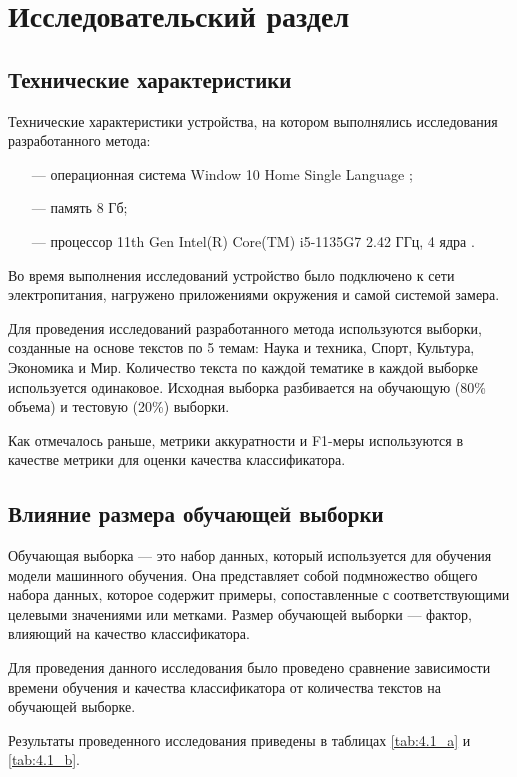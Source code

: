 \chapter{Исследовательский раздел}
\section{Технические характеристики}
Технические характеристики устройства, на котором выполнялись исследования разработанного метода:

\begin{itemize}
	\item[---] операционная система Window 10 Home Single Language \cite{window};
	\item[---] память 8 Гб;
	\item[---] процессор 11th Gen Intel(R) Core(TM) i5-1135G7 2.42 ГГц, 4 ядра \cite{cpu}.
\end{itemize}

Во время выполнения исследований устройство было подключено к сети электропитания, нагружено приложениями окружения и самой системой замера.

Для проведения исследований разработанного метода используются выборки, созданные на основе текстов по 5 темам: Наука и техника, Спорт, Культура, Экономика и Мир. Количество текста по каждой тематике в каждой выборке используется одинаковое. Исходная выборка разбивается на обучающую (80\% объема) и тестовую (20\%) выборки. 

Как отмечалось раньше, метрики аккуратности и F1-меры используются в качестве метрики для оценки качества классификатора.

\section{Влияние размера обучающей выборки}
Обучающая выборка --- это набор данных, который используется для обучения модели машинного обучения. Она представляет собой подмножество общего набора данных, которое содержит примеры, сопоставленные с соответствующими целевыми значениями или метками. Размер обучающей выборки --- фактор, влияющий на качество классификатора.

Для проведения данного исследования было проведено сравнение зависимости времени обучения и качества классификатора от количества текстов на обучающей выборке.

Результаты проведенного исследования приведены в таблицах \ref{tab:4.1_a} и \ref{tab:4.1_b}.

